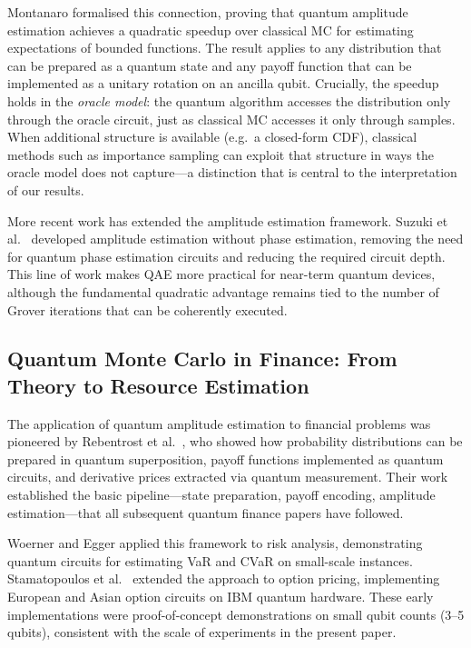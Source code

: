 \documentclass[11pt,a4paper]{article}
\begin{document}
Montanaro \cite{Montanaro2015} formalised this connection, proving that quantum amplitude estimation achieves a quadratic speedup over classical MC for estimating expectations of bounded functions. The result applies to any distribution that can be prepared as a quantum state and any payoff function that can be implemented as a unitary rotation on an ancilla qubit. Crucially, the speedup holds in the \emph{oracle model}: the quantum algorithm accesses the distribution only through the oracle circuit, just as classical MC accesses it only through samples. When additional structure is available (e.g.\ a closed-form CDF), classical methods such as importance sampling can exploit that structure in ways the oracle model does not capture---a distinction that is central to the interpretation of our results.

More recent work has extended the amplitude estimation framework. Suzuki et al.\ \cite{Suzuki2020} developed amplitude estimation without phase estimation, removing the need for quantum phase estimation circuits and reducing the required circuit depth. This line of work makes QAE more practical for near-term quantum devices, although the fundamental quadratic advantage remains tied to the number of Grover iterations that can be coherently executed.

\subsection{Quantum Monte Carlo in Finance: From Theory to Resource Estimation}

The application of quantum amplitude estimation to financial problems was pioneered by Rebentrost et al.\ \cite{Rebentrost2018}, who showed how probability distributions can be prepared in quantum superposition, payoff functions implemented as quantum circuits, and derivative prices extracted via quantum measurement. Their work established the basic pipeline---state preparation, payoff encoding, amplitude estimation---that all subsequent quantum finance papers have followed.

Woerner and Egger \cite{Woerner2019} applied this framework to risk analysis, demonstrating quantum circuits for estimating VaR and CVaR on small-scale instances. Stamatopoulos et al.\ \cite{Stamatopoulos2020} extended the approach to option pricing, implementing European and Asian option circuits on IBM quantum hardware. These early implementations were proof-of-concept demonstrations on small qubit counts (3--5 qubits), consistent with the scale of experiments in the present paper.
\end{document}
